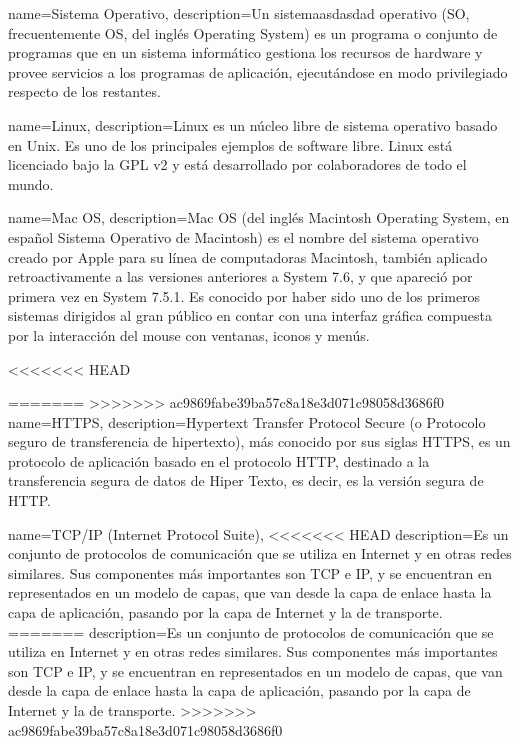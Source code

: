 {name=Sistema Operativo,
description={Un sistemaasdasdad operativo (SO, frecuentemente OS, del inglés Operating System) es un programa o conjunto de programas que en un sistema informático gestiona los recursos de hardware y provee servicios a los programas de aplicación, ejecutándose en modo privilegiado respecto de los restantes.}
}

{name=Linux,
description={Linux es un núcleo libre de sistema operativo basado en Unix. Es uno de los principales ejemplos de software libre. Linux está licenciado bajo la GPL v2 y está desarrollado por colaboradores de todo el mundo.}
}

{name=Mac OS,
description={Mac OS (del inglés Macintosh Operating System, en español Sistema Operativo de Macintosh) es el nombre del sistema operativo creado por Apple para su línea de computadoras Macintosh, también aplicado retroactivamente a las versiones anteriores a System 7.6, y que apareció por primera vez en System 7.5.1. Es conocido por haber sido uno de los primeros sistemas dirigidos al gran público en contar con una interfaz gráfica compuesta por la interacción del mouse con ventanas, iconos y menús.}
}

<<<<<<< HEAD
 
=======
>>>>>>> ac9869fabe39ba57c8a18e3d071c98058d3686f0
{name=HTTPS,
description={Hypertext Transfer Protocol Secure (o Protocolo seguro de transferencia de hipertexto), más conocido por sus siglas HTTPS, es un protocolo de aplicación basado en el protocolo HTTP, destinado a la transferencia segura de datos de Hiper Texto, es decir, es la versión segura de HTTP.}
}

{name=TCP/IP (Internet Protocol Suite),
<<<<<<< HEAD
 description={Es un conjunto de protocolos de comunicación que se utiliza en Internet y en otras redes similares. Sus componentes más importantes son TCP e IP, y se encuentran en representados en un modelo de capas, que van desde la capa de enlace hasta la capa de aplicación, pasando por la capa de Internet y la de transporte.}
=======
description={Es un conjunto de protocolos de comunicación que se utiliza en Internet y en otras redes similares. Sus componentes más importantes son TCP e IP, y se encuentran en representados en un modelo de capas, que van desde la capa de enlace hasta la capa de aplicación, pasando por la capa de Internet y la de transporte.}
>>>>>>> ac9869fabe39ba57c8a18e3d071c98058d3686f0
}